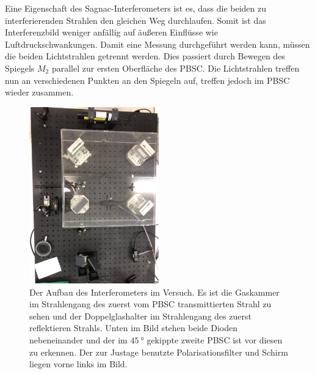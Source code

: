 
\noindent Eine Eigenschaft des Sagnac-Interferometers ist es, dass die beiden zu interferierenden Strahlen den gleichen Weg durchlaufen. Somit ist das Interferenzbild weniger 
anfällig auf äußeren Einflüsse wie Luftdruckschwankungen. Damit eine Messung durchgeführt werden kann, müssen die beiden Lichtstrahlen getrennt werden. Dies passiert durch Bewegen 
des Spiegels $M_2$ parallel zur ersten Oberfläche des PBSC. Die Lichtstrahlen treffen nun an verschiedenen Punkten an den Spiegeln auf, treffen jedoch im PBSC wieder zusammen. 

\begin{figure}[H]
    \centering
    \includegraphics[width=0.5\textwidth]{bilder/interfer_foto.png}
    \caption{Der Aufbau des Interferometers im Versuch. Es ist die Gaskammer im Strahlengang des zuerst vom PBSC transmittierten Strahl zu sehen und der Doppelglashalter im Strahlengang 
    des zuerst reflektieren Strahls. Unten im Bild stehen beide Dioden nebeneinander und der im $\SI{45}{\degree}$ gekippte zweite PBSC ist vor diesen zu erkennen. Der zur Justage benutzte 
    Polarisationsfilter und Schirm liegen vorne links im Bild.}
    \label{fig:Interferob}   
\end{figure}


